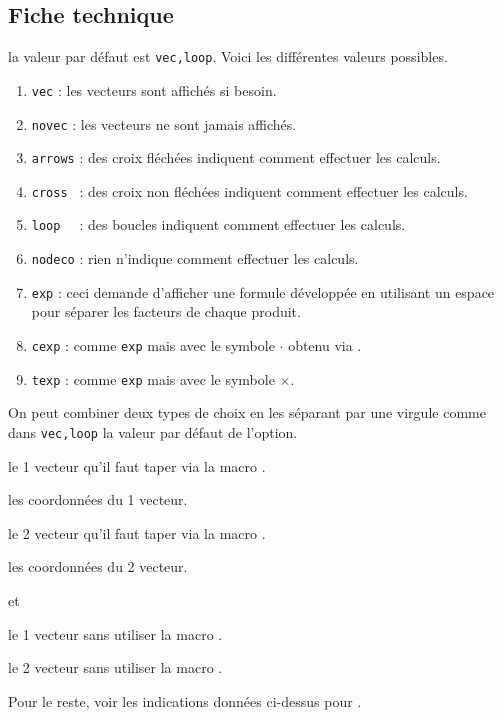 \documentclass[12pt,a4paper]{article}
\begin{document}
\subsection{Fiche technique}

 \hfill {}


\IDoption{} la valeur par défaut est \verb+vec,loop+. Voici les différentes valeurs possibles.
\begin{enumerate}
    \item \verb+vec+ : les vecteurs sont affichés si besoin.

    \item \verb+novec+ : les vecteurs ne sont jamais affichés.

    \medskip
    
    \item \verb+arrows+ : des croix fléchées indiquent comment effectuer les calculs.

    \item \verb+cross + : des croix non fléchées indiquent comment effectuer les calculs.

    \item \verb+loop  + : des boucles indiquent comment effectuer les calculs.

    \item \verb+nodeco+ : rien n'indique comment effectuer les calculs.

    \medskip

    \item \verb+exp+ : ceci demande d'afficher une formule développée en utilisant un espace pour séparer les facteurs de chaque produit.

    \item \verb+cexp+ : comme \verb+exp+ mais avec le symbole $\cdot$ obtenu via .

    \item \verb+texp+ : comme \verb+exp+ mais avec le symbole $\times$.
\end{enumerate}

            On peut combiner deux types de choix en les séparant par une virgule comme dans \verb+vec,loop+ la valeur par défaut de l'option.


 le 1\ier{} vecteur qu'il faut taper via la macro .

 les coordonnées du 1\ier{} vecteur.

 le 2\ieme{} vecteur qu'il faut taper via la macro .

 les coordonnées du 2\ieme{} vecteur.


\separation


 \hfill {}
                                  et 

 le 1\ier{} vecteur sans utiliser la macro .

 le 2\ieme{} vecteur sans utiliser la macro .

\medskip

Pour le reste, voir les indications données ci-dessus pour .
%
\end{document}
